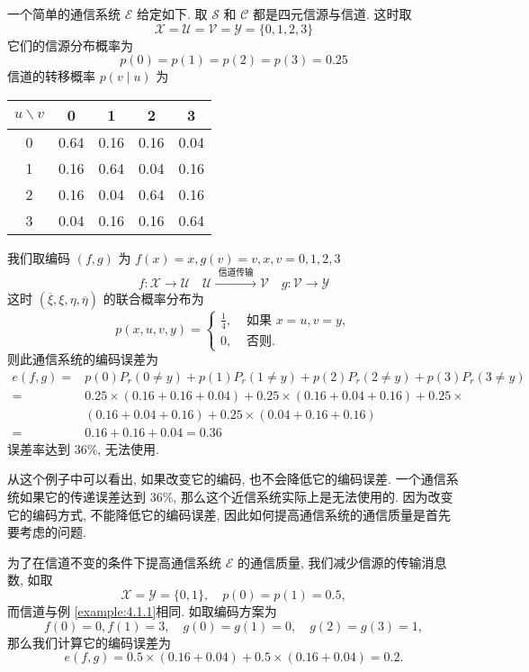 \begin{example}\label{example:4.1.1}
    一个简单的通信系统 $ \mathscr{E} $ 给定如下. 取 $ \mathscr{S} $ 和 $ \mathscr{C} $ 都是四元信源与信道. 这时取 $$ \mathscr{X}=\mathscr{U}=\mathscr{V}=\mathscr{Y}=\{0,1,2,3\} $$它们的信源分布概率为 $$ p(0)=p(1)=p(2)=p(3)=0.25 $$ 信道的转移概率 $ p(v \mid u) $ 为
\begin{center}
\begin{tabular}{c|cccc}
$ u \backslash v $ & 0 & 1 & 2 & 3 \\
\hline
0 & 0.64 & 0.16 & 0.16 & 0.04 \\
1 & 0.16 & 0.64 & 0.04 & 0.16 \\
2 & 0.16 & 0.04 & 0.64 & 0.16 \\
3 & 0.04 & 0.16 & 0.16 & 0.64
\end{tabular}
\end{center}

我们取编码 $ (f, g) $ 为 $ f(x)=x, g(v)=v, x, v=0,1,2,3 $
$$ f: \mathscr{X} \longrightarrow \mathscr{U} \quad \mathscr{U} \xrightarrow{\text { 信道传输 }} \mathscr{V} \quad g: \mathscr{V} \longrightarrow \mathscr{Y} $$
这时 $ (\overline{\xi}, \xi, \eta, \overline{\eta}) $ 的联合概率分布为
$$
p(x, u, v, y)=\left\{\begin{array}{ll}
\frac{1}{4}, & \text { 如果 } x=u, v=y, \\
0, & \text { 否则. }
\end{array}\right.
$$
则此通信系统的编码误差为
$$
\begin{aligned}
e(f, g)= & p(0) P_{r}(0 \neq y)+p(1) P_{r}(1 \neq y)+p(2) P_{r}(2 \neq y)+p(3) P_{r}(3 \neq y) \\
= & 0.25 \times(0.16+0.16+0.04)+0.25 \times(0.16+0.04+0.16)+0.25 \times \\
& (0.16+0.04+0.16)+0.25 \times(0.04+0.16+0.16) \\
= & 0.16+0.16+0.04=0.36
\end{aligned}
$$
误差率达到 $ 36 \% $, 无法使用.
\end{example}
从这个例子中可以看出, 如果改变它的编码, 也不会降低它的编码误差. 一个通信系统如果它的传递误差达到 $ 36 \% $, 那么这个近信系统实际上是无法使用的. 因为改变它的编码方式, 不能降低它的编码误差, 因此如何提高通信系统的通信质量是首先要考虑的问题.

\begin{example}\label{example:4.1.2}
    为了在信道不变的条件下提高通信系统 $ \mathscr{E} $ 的通信质量, 我们减少信源的传输消息数, 如取
$$
\mathscr{X}=\mathscr{Y}=\{0,1\}, \quad p(0)=p(1)=0.5,
$$
而信道与例 \ref{example:4.1.1}相同. 如取编码方案为
$$
f(0)=0, f(1)=3, \quad g(0)=g(1)=0, \quad g(2)=g(3)=1,
$$
那么我们计算它的编码误差为
$$
e(f, g)=0.5 \times(0.16+0.04)+0.5 \times(0.16+0.04)=0.2 .
$$
\end{example}


